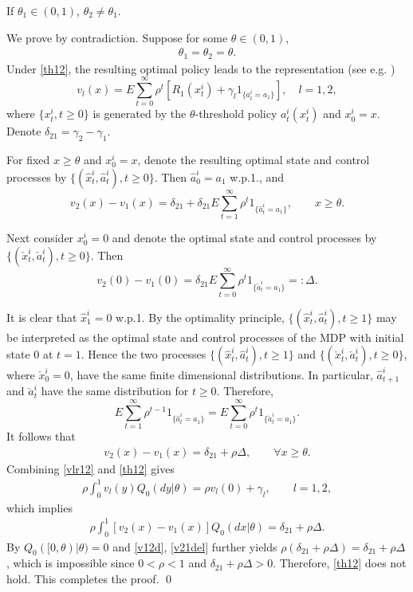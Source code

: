 \documentclass[graybox]{svmult}
\begin{document}
\begin{lemma}\label{lemma:the12}
 If $\theta_1\in (0, 1)$, $\theta_2\ne \theta_1$.
\end{lemma}


\proof
We prove by contradiction. Suppose for some $\theta\in (0,1)$,
\begin{align}
\theta_1=\theta_2=\theta.  \label{th12}
\end{align}
Under   \eqref{th12},
 the resulting optimal policy leads to  the representation (see e.g. \cite[pp. 22]{HL93})
$$
v_l(x)= E\sum_{t=0}^\infty \rho^t \left[R_1( x_t^{i})+\gamma_l 1_{\{ a_t^i=a_1\}}\right], \quad l=1,2,
$$
where $\{ x_t^i, t\ge 0\}$ is generated by the $\theta$-threshold policy $a_t^i( x_t^i)$ and $x_0^i=x$. Denote $\delta_{21}=\gamma_2-\gamma_1$.

For  fixed $x\ge \theta$ and $ x_0^i=x$, denote the resulting optimal state and control processes by $\{(\hat x_t^i, \hat a_t^i), t\ge 0  \}$.
Then $\hat a_0^i =a_1$ w.p.1.,  and
$$
v_2(x)-v_1(x)= \delta_{21} +\delta_{21} E\sum_{t=1}^\infty \rho^t1_{\{ \hat a_t^i=a_{1}\}}, \qquad x\ge \theta.
 $$

Next consider  $x_0^i=0$ and denote the optimal state and control processes by
$\{(\check{x}_t^i, \check{a}_t^i), t\ge 0  \}$.
Then
$$
v_2(0)-v_1(0)= \delta_{21} E\sum_{t=0}^\infty \rho^t1_{\{ \check{a}_t^i=a_{1}\}}
=: \Delta.
$$

It is clear that $\hat x_1^i=0$ w.p.1. By the optimality principle,
$\{(\hat x_t^i, \hat a_t^i), t\ge 1  \}$ may be interpreted as the optimal state and control processes of the MDP with initial
state 0 at $t=1$. Hence the two processes $\{(\hat x_t^i, \hat a_t^i), t\ge 1  \}$ and $\{(\check{x}_t^i, \check{a}_t^i), t\ge 0  \}$, where ${\check x}_0^i=0$, have the same finite dimensional distributions. In particular, $\hat a_{t+1}^i$ and $\check{a}_t^i$ have the same distribution for $t\ge 0$.
Therefore,
$$
E\sum_{t=1}^\infty \rho^{t-1}1_{\{ \hat a_t^i=a_{1}\}}
=
E\sum_{t=0}^\infty \rho^t1_{\{ \check{a}_t^i=a_{1}\}}.
$$
It follows that
\begin{align}
v_2(x)-v_1(x)= \delta_{21}+\rho \Delta, \qquad \forall x\ge  \theta. \label{v12d}
\end{align}
Combining
  \eqref{vlr12} and \eqref{th12} gives
 \begin{align*}
\rho \int_0^1 v_l(y) Q_0(dy|\theta)=  \rho v_l(0)+\gamma_l  ,
 \qquad l=1, 2,
 \end{align*}
 which implies
 \begin{align}
\rho \int_0^1 [v_2(x)-v_1(x)] Q_0(dx|\theta)  =\delta_{21}+ \rho \Delta.  \label{v21del}
 \end{align}
By  $Q_0([0, \theta)|\theta)=0$ and \eqref{v12d},  \eqref{v21del} further yields
 $\rho( \delta_{21}+ \rho \Delta) =  \delta_{21}+\rho \Delta$,
 which is impossible since $0<\rho<1$ and $\delta_{21}+\rho \Delta>0$.
 Therefore, \eqref{th12} does not hold. This completes the proof.
  \qed
\end{document}
